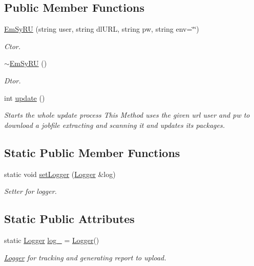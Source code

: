 \subsection*{Public Member Functions}
\begin{DoxyCompactItemize}
\item 
\hyperlink{classEmSyRU_ac5d6a38500bc912eba862a14cfb0b1b2}{Em\-Sy\-R\-U} (string user, string dl\-U\-R\-L, string pw, string env=\char`\"{}\char`\"{})
\begin{DoxyCompactList}\small\item\em Ctor. \end{DoxyCompactList}\item 
\hypertarget{classEmSyRU_abad85d79a8bd0176f4a7f95d1df2f03e}{\hyperlink{classEmSyRU_abad85d79a8bd0176f4a7f95d1df2f03e}{$\sim$\-Em\-Sy\-R\-U} ()}\label{classEmSyRU_abad85d79a8bd0176f4a7f95d1df2f03e}

\begin{DoxyCompactList}\small\item\em Dtor. \end{DoxyCompactList}\item 
int \hyperlink{classEmSyRU_aeccfb365e5aac8a9b5fee2557645353d}{update} ()
\begin{DoxyCompactList}\small\item\em Starts the whole update process This Method uses the given url user and pw to download a jobfile extracting and scanning it and updates its packages. \end{DoxyCompactList}\end{DoxyCompactItemize}
\subsection*{Static Public Member Functions}
\begin{DoxyCompactItemize}
\item 
static void \hyperlink{classEmSyRU_a2720ea250a00225d5640145fecc66ff2}{set\-Logger} (\hyperlink{classLogger}{Logger} \&log)
\begin{DoxyCompactList}\small\item\em Setter for logger. \end{DoxyCompactList}\end{DoxyCompactItemize}
\subsection*{Static Public Attributes}
\begin{DoxyCompactItemize}
\item 
\hypertarget{classEmSyRU_a63f349fb8a0000e9fec67de2cabfd216}{static \hyperlink{classLogger}{Logger} \hyperlink{classEmSyRU_a63f349fb8a0000e9fec67de2cabfd216}{log\-\_\-} = \hyperlink{classLogger}{Logger}()}\label{classEmSyRU_a63f349fb8a0000e9fec67de2cabfd216}

\begin{DoxyCompactList}\small\item\em \hyperlink{classLogger}{Logger} for tracking and generating report to upload. \end{DoxyCompactList}\end{DoxyCompactItemize}


